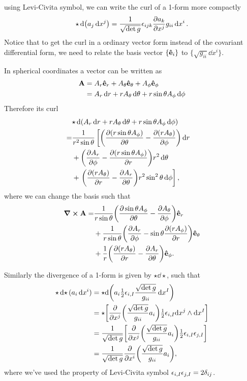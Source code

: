 \documentclass[10pt]{article}
\begin{document}
	using Levi-Civita symbol, we can write the curl of a 1-form more compactly
	\begin{equation}
		\star \dd(a_j \dd{x^j}) = \frac{1}{\sqrt{\det g}} \epsilon_{ijk} \pdv{a_k}{x^j} g_{ii} \dd{x^i}.
	\end{equation}
	Notice that to get the curl in a ordinary vector form instead of the covariant differential form, we need to relate the basis vector $\{ \vu{e}_i \}$ to $\{ \sqrt{g_{ii}} \dd{x^i} \}$.
	\begin{example}
		In spherical coordinates a vector can be written as
		\begin{align*}
			{\bf A} &= A_r \vu{e}_r + A_{\theta} \vu{e}_{\theta} + A_{\phi} \vu{e}_{\phi} \\
			&= A_r \dd{r} + r A_{\theta} \dd{\theta} + r \sin{\theta} A_{\phi} \dd{\phi}
		\end{align*}
		Therefore its curl
		\begin{align*}
			\lefteqn{\star \dd(A_r \dd{r} + r A_{\theta} \dd{\theta} + r \sin{\theta} A_{\phi} \dd{\phi})} \\
			=& \frac{1}{r^2 \sin{\theta}}  \left[\pqty{\pdv{(r \sin{\theta} A_{\phi})}{\theta} - \pdv{(r A_{\theta})}{\phi}} \dd{r} \right. \\
			&+ \pqty{\pdv{A_r}{\phi} - \pdv{(r \sin{\theta} A_{\phi})}{r}} r^2 \dd{\theta} \\
			&+ \left. \pqty{\pdv{(r A_{\theta})}{r} - \pdv{A_r}{\theta}} r^2 \sin^2{\theta} \dd{\phi} \right],
		\end{align*}
		where we can change the basis such that
		\begin{align*}
			\curl{\bfA} =& \frac{1}{r \sin{\theta}} \pqty{\pdv{ \sin{\theta} A_{\phi}}{\theta} - \pdv{ A_{\theta}}{\phi}} \vu{e}_{r} \\
			&+ \frac{1}{r \sin{\theta}} \pqty{\pdv{A_r}{\phi} - \sin{\theta} \pdv{(r A_{\phi})}{r}} \vu{e}_{\theta} \\
			&+ \frac{1}{r} \pqty{\pdv{(r A_{\theta})}{r} - \pdv{A_r}{\theta}} \vu{e}_{\phi}.
		\end{align*}
	\end{example}
	Similarly the divergence of a 1-form is given by $\star\dd{\star}$, such that
	\begin{align*}
		\star\dd{\star} (a_i \dd{x^i}) &= \star\dd \pqty{a_i \thalf \eps_{i, I} \frac{\sqrt{\det g}}{g_{ii}} \dd{x^{I}}} \\
		&= \star \bqty{\pdv{x^j} \pqty{\frac{\sqrt{\det g}}{g_{ii}} a_i} \thalf \eps_{i, I} \dd x^j \wedge \dd{x^{I}}} \\
		&= \frac{1}{\sqrt{\det g}} \bqty{\pdv{x^j} \pqty{\frac{\sqrt{\det g}}{g_{ii}} a_i} \thalf \eps_{i, I} \eps_{j, I}} \\
		&= \frac{1}{\sqrt{\det g}} \pdv{x^i} \pqty{\frac{\sqrt{\det g}}{g_{ii}} a_i},
	\end{align*}
	where we've used the property of Levi-Civita symbol $\epsilon_{i, I} \epsilon_{j, I} = 2 \delta_{ij}$.
\end{document}
